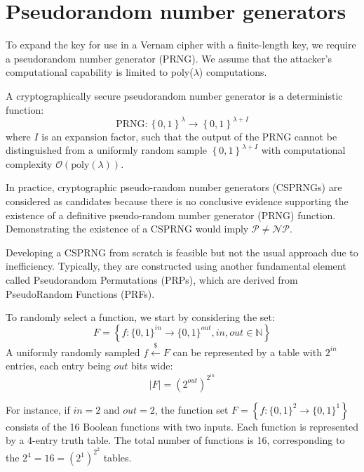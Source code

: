 \section{Pseudorandom number generators}

To expand the key for use in a Vernam cipher with a finite-length key, we require a pseudorandom number generator (PRNG).
We assume that the attacker's computational capability is limited to poly($\lambda$) computations. 
\begin{definition}
    A cryptographically secure pseudorandom number generator is a deterministic function:
    \[\text{PRNG}:\left\{ 0,1 \right\}^\lambda \rightarrow \left\{ 0,1 \right\}^{\lambda+I}\] 
    where $I$ is an expansion factor, such that the output of the PRNG cannot be distinguished from a uniformly random sample $ \left\{ 0,1 \right\}^{\lambda+I}$ with computational complexity $\mathcal{O} (\text{poly}(\lambda))$. 
\end{definition}
In practice, cryptographic pseudo-random number generators (CSPRNGs) are considered as candidates because there is no conclusive evidence supporting the existence of a definitive pseudo-random number generator (PRNG) function.
Demonstrating the existence of a CSPRNG would imply $\mathcal{P} \neq \mathcal{NP}$.

Developing a CSPRNG from scratch is feasible but not the usual approach due to inefficiency. 
Typically, they are constructed using another fundamental element called Pseudorandom Permutations (PRPs), which are derived from PseudoRandom Functions (PRFs).

To randomly select a function, we start by considering the set:
\[F=\left\{ f:\{0,1\}^{in}\rightarrow\{0,1\}^{out}, in,out \in \mathbb{N}  \right\}\]
A uniformly randomly sampled $f \overset{\$}{\leftarrow}F$  can be represented by a table with $2^{in}$ entries, each entry being $out$ bits wide: 
\[\left\lvert F \right\rvert = \left( 2^{out} \right)^{2^{in}}\]
\begin{example}
    For instance, if $in=2$ and $out = 2$, the function set $F=\left\{ f:\{0,1\}^{2}\rightarrow\{0,1\}^{1} \right\}$ consists of the 16 Boolean functions with two inputs.
    Each function is represented by a 4-entry truth table.
    The total number of functions is 16, corresponding to the $2^4=16=\left( 2^1 \right)^{2^2}$ tables.
\end{example}

